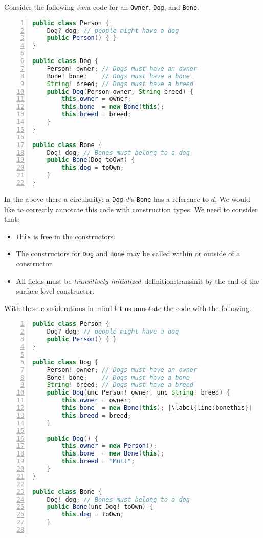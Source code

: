 \documentclass{article}
\begin{document}
\begin{example}
  Consider the following Java code for an \texttt{Owner}, \texttt{Dog}, and \texttt{Bone}.
\begin{lstlisting}[language=Java, escapechar=|, numbers=left]
 public class Person {
    Dog? dog; // people might have a dog
    public Person() { }
}

public class Dog {
    Person! owner; // Dogs must have an owner
    Bone! bone;    // Dogs must have a bone
    String! breed; // Dogs must have a breed
    public Dog(Person owner, String breed) {
        this.owner = owner;
        this.bone  = new Bone(this);
        this.breed = breed;
    }
}

public class Bone {
    Dog! dog; // Bones must belong to a dog
    public Bone(Dog toOwn) {
        this.dog = toOwn;
    }
}
\end{lstlisting}
  In the above there a circularity: a \texttt{Dog} $d$'s \texttt{Bone} has a reference to $d$.
  We would like to correctly annotate this code with construction types.
  We need to consider that:
  \begin{itemize}
  \item \texttt{this} is free in the constructors.
  \item The constructors for \texttt{Dog} and \texttt{Bone} may be called within or outside of a constructor.
  \item All fields must be \textit{transitively initialized}~{definition:transinit} by the end of the surface level constructor.
  \end{itemize}
  With these considerations in mind let us annotate the code with the following.
\begin{lstlisting}[language=Java, escapechar=|, numbers=left]
 public class Person {
    Dog? dog; // people might have a dog
    public Person() { }
}

public class Dog {
    Person! owner; // Dogs must have an owner
    Bone! bone;    // Dogs must have a bone
    String! breed; // Dogs must have a breed
    public Dog(unc Person! owner, unc String! breed) {
        this.owner = owner;
        this.bone  = new Bone(this); |\label{line:bonethis}|
        this.breed = breed;
    }

    public Dog() {
        this.owner = new Person();
        this.bone  = new Bone(this);
        this.breed = "Mutt";
    }
}

public class Bone {
    Dog! dog; // Bones must belong to a dog
    public Bone(unc Dog! toOwn) {
        this.dog = toOwn;
    }


\end{lstlisting}
\end{example}
\end{document}
